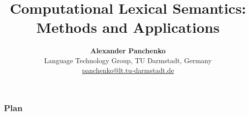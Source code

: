\documentclass{beamer}
\title[\insertframenumber/\inserttotalframenumber]
{\textbf{Computational Lexical Semantics: \\ Methods and Applications }}
\subtitle{}
\author[Alexander Panchenko]
{\textbf{Alexander Panchenko} \\ Language Technology Group, TU Darmstadt, Germany   \\ { \url{panchenko@lt.tu-darmstadt.de}  }}
\begin{document}
\begin{frame}
  \titlepage
\end{frame}

\begin{frame}
  \setcounter{tocdepth}{1}
  \frametitle{Plan}
  \tableofcontents
  \setcounter{tocdepth}{2}
\end{frame}










%
%
%
%
\end{document}
